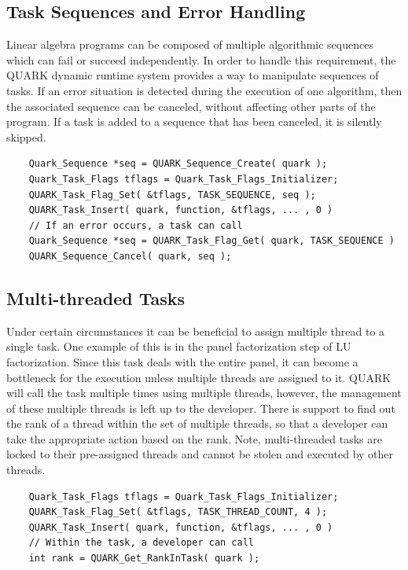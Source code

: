 \documentclass[11pt,letterpaper]{report}
\begin{document}
\subsection{Task Sequences and Error Handling}
Linear algebra programs can be composed of multiple algorithmic
sequences which can fail or succeed independently.  In order to handle
this requirement, the QUARK dynamic runtime system provides a way to
manipulate sequences of tasks.  If an error situation is detected
during the execution of one algorithm, then the associated sequence
can be canceled, without affecting other parts of the program.  If a task
is added to a sequence that has been canceled, it is silently
skipped.
\begin{samepage}
\begin{lstlisting}
    Quark_Sequence *seq = QUARK_Sequence_Create( quark );
    Quark_Task_Flags tflags = Quark_Task_Flags_Initializer;
    QUARK_Task_Flag_Set( &tflags, TASK_SEQUENCE, seq );
    QUARK_Task_Insert( quark, function, &tflags, ... , 0 )
    // If an error occurs, a task can call
    Quark_Sequence *seq = QUARK_Task_Flag_Get( quark, TASK_SEQUENCE )
    QUARK_Sequence_Cancel( quark, seq );
\end{lstlisting}
\end{samepage}

\subsection{Multi-threaded Tasks}
Under certain circumstances it can be beneficial to assign multiple
thread to a single task.  One example of this is in the panel
factorization step of LU factorization.  Since this task deals with
the entire panel, it can become a bottleneck for the execution unless
multiple threads are assigned to it.  QUARK will call the task
multiple times using multiple threads, however, the management of
these multiple threads is left up to the developer.  There is support
to find out the rank of a thread within the set of multiple threads,
so that a developer can take the appropriate action based on the rank.
Note, multi-threaded tasks are locked to their pre-assigned threads
and cannot be stolen and executed by other threads.
\begin{samepage}
\begin{lstlisting}
    Quark_Task_Flags tflags = Quark_Task_Flags_Initializer;
    QUARK_Task_Flag_Set( &tflags, TASK_THREAD_COUNT, 4 );
    QUARK_Task_Insert( quark, function, &tflags, ... , 0 )
    // Within the task, a developer can call
    int rank = QUARK_Get_RankInTask( quark );
\end{lstlisting}
\end{samepage}
\end{document}
